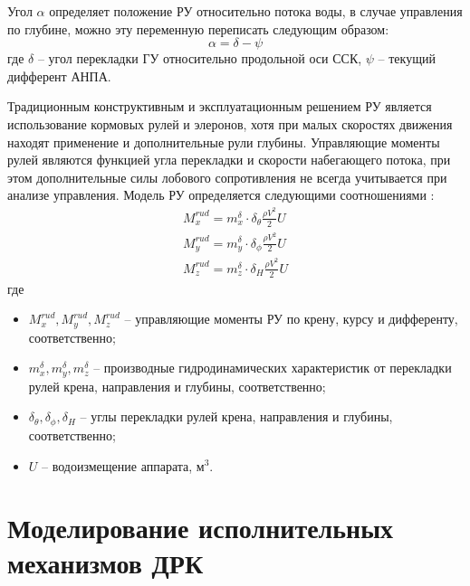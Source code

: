 Угол $\alpha$ определяет положение РУ относительно потока воды, в случае управления по глубине, можно эту переменную переписать следующим образом:
\begin{equation*}
    \alpha = \delta - \psi
\end{equation*}
\noindent где $\delta$ -- угол перекладки ГУ относительно продольной оси ССК, $\psi$ -- текущий дифферент АНПА.

Традиционным конструктивным и эксплуатационным решением РУ является использование кормовых рулей и элеронов, хотя при малых скоростях движения находят применение и дополнительные рули глубины.
Управляющие моменты рулей являются функцией угла перекладки и скорости набегающего потока, при этом дополнительные силы лобового сопротивления не всегда учитывается при анализе управления.
Модель РУ определяется следующими соотношениями \cite{боженов1986}:
\begin{equation}
	\label{eq:modelling-rudder}
	\begin{array}{ll}
    M_x^{rud} = m_x^{\delta} \cdot \delta_{\theta} \frac{\rho V^2}{2} U \\
    M_y^{rud} = m_y^{\delta} \cdot \delta_{\phi} \frac{\rho V^2}{2} U \\
    M_z^{rud} = m_z^{\delta} \cdot \delta_{H} \frac{\rho V^2}{2} U
    \end{array}
\end{equation}
\noindent где
\begin{itemize}
    \item $M_x^{rud}, M_y^{rud}, M_z^{rud}$ -- управляющие моменты РУ по крену, курсу и дифференту, соответственно;
    \item $m_x^{\delta}, m_y^{\delta}, m_z^{\delta}$ -- производные гидродинамических характеристик от перекладки рулей крена, направления и глубины, соответственно;
    \item $\delta_{\theta}, \delta_{\phi}, \delta_{H}$ -- углы перекладки рулей крена, направления и глубины, соответственно;
    \item $U$ -- водоизмещение аппарата, м$^3$.
\end{itemize}

\section{Моделирование исполнительных механизмов ДРК}
